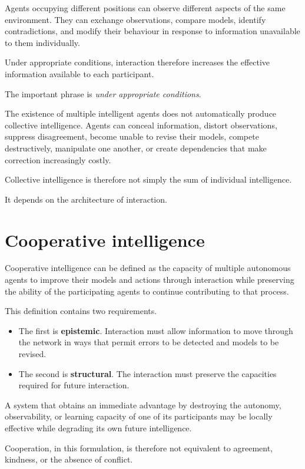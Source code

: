 \documentclass[11pt, a4paper]{article}
\begin{document}
Agents occupying different positions can observe different aspects of the same environment. They can exchange observations, compare models, identify contradictions, and modify their behaviour in response to information unavailable to them individually.

Under appropriate conditions, interaction therefore increases the effective information available to each participant.

The important phrase is \emph{under appropriate conditions}.

The existence of multiple intelligent agents does not automatically produce collective intelligence. Agents can conceal information, distort observations, suppress disagreement, become unable to revise their models, compete destructively, manipulate one another, or create dependencies that make correction increasingly costly.

Collective intelligence is therefore not simply the sum of individual intelligence.

It depends on the architecture of interaction.

\section{Cooperative intelligence}
Cooperative intelligence can be defined as the capacity of multiple autonomous agents to improve their models and actions through interaction while preserving the ability of the participating agents to continue contributing to that process.

This definition contains two requirements.

\begin{itemize}[leftmargin=*]
    \item The first is \textbf{epistemic}. Interaction must allow information to move through the network in ways that permit errors to be detected and models to be revised.
    \item The second is \textbf{structural}. The interaction must preserve the capacities required for future interaction.
\end{itemize}

A system that obtains an immediate advantage by destroying the autonomy, observability, or learning capacity of one of its participants may be locally effective while degrading its own future intelligence.

Cooperation, in this formulation, is therefore not equivalent to agreement, kindness, or the absence of conflict.
\end{document}
